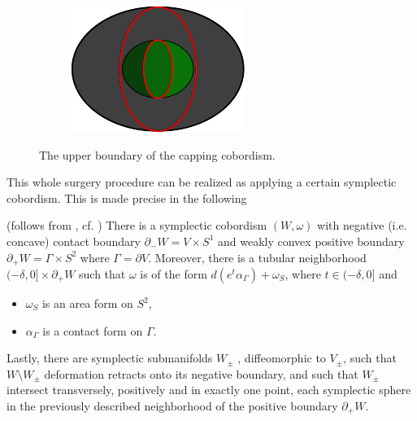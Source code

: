 \begin{figure}[h!]
\begin{subfigure}{.9\linewidth}
    \end{subfigure}
    \begin{subfigure}{.9\linewidth}
        \centering
        \includegraphics[trim=-.5cm -.5cm -.5cm -.5cm, width=.5\linewidth]{images/gamma_times_s2.pdf}
    \end{subfigure}
    \caption[short]{The upper boundary of the capping cobordism.}
    \label{fig:cap_cobordism}
\end{figure}

This whole surgery procedure can be realized as applying a certain symplectic cobordism.
This is made precise in the following
\begin{lemma}(follows from \cite[Theorem 6.1]{MNW13}, cf. \cite[Lemma 6.1]{BGM22})\label{lem:capping_cobordism}
    There is a symplectic cobordism $(W, \omega)$ with negative (i.e. concave) 
    contact boundary $\partial_-W = V \times S^1$ and weakly convex positive boundary
    $\partial_+ W = \Gamma \times S^2$ where $\Gamma = \partial V$. 
    Moreover, there is a tubular neighborhood $(-\delta, 0] \times \partial_+ W$
    such that $\omega$ is of the form $d(e^t \alpha_\Gamma) + \omega_S$, 
    where $t \in (-\delta, 0]$ and 
    \begin{itemize}
        \item $\omega_S$ is an area form on $S^2$,
        \item $\alpha_\Gamma$ is a contact form on $\Gamma$.
    \end{itemize}
    Lastly, there are symplectic submanifolds $W_\pm$ , diffeomorphic to $V_\pm$, 
    such that $W\setminus W_\pm$ deformation retracts onto its negative boundary, 
    and such that $W_\pm$ intersect transversely, positively and in exactly one point, 
    each symplectic sphere in the previously described neighborhood 
    of the positive boundary $\partial_+ W$.
\end{lemma}

